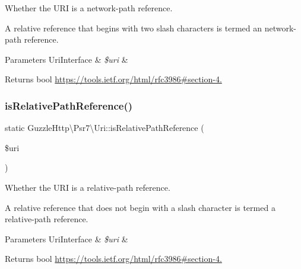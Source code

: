 Whether the U\+RI is a network-\/path reference.

A relative reference that begins with two slash characters is termed an network-\/path reference.


\begin{DoxyParams}[1]{Parameters}
Uri\+Interface & {\em \$uri} & \\
\hline
\end{DoxyParams}
\begin{DoxyReturn}{Returns}
bool \hyperlink{}{https\+://tools.\+ietf.\+org/html/rfc3986\#section-\/4.}
\end{DoxyReturn}
\mbox{\label{classGuzzleHttp_1_1Psr7_1_1Uri_a0a323a09016078d6174b90a5664578a6}} 
\subsubsection{\texorpdfstring{is\+Relative\+Path\+Reference()}{isRelativePathReference()}}
{\footnotesize\ttfamily static Guzzle\+Http\textbackslash{}\+Psr7\textbackslash{}\+Uri\+::is\+Relative\+Path\+Reference (\begin{DoxyParamCaption}\item[{\hyperlink{interfacePsr_1_1Http_1_1Message_1_1UriInterface}{Uri\+Interface}}]{\$uri }\end{DoxyParamCaption})\hspace{0.3cm}{\ttfamily [static]}}

Whether the U\+RI is a relative-\/path reference.

A relative reference that does not begin with a slash character is termed a relative-\/path reference.


\begin{DoxyParams}[1]{Parameters}
Uri\+Interface & {\em \$uri} & \\
\hline
\end{DoxyParams}
\begin{DoxyReturn}{Returns}
bool \hyperlink{}{https\+://tools.\+ietf.\+org/html/rfc3986\#section-\/4.}
\end{DoxyReturn}
\mbox{\label{classGuzzleHttp_1_1Psr7_1_1Uri_a902dc2b5cca5ba1feca4555aff79845d}} 
